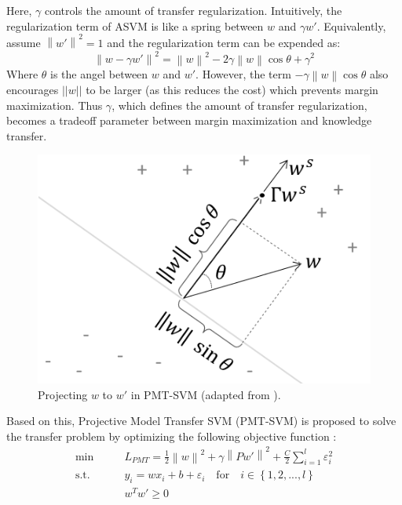 Here, $\gamma$ controls the amount of transfer regularization. Intuitively, the regularization term of ASVM is like a spring between $w$ and $\gamma w'$. Equivalently, assume ${\left\| {w'} \right\|^2}=1$ and the regularization term can be expended as:
\begin{equation*}
{\left\| {w - \gamma w'} \right\|^2} = {\left\| w \right\|^2} - 2\gamma \left\| w \right\|\cos \theta  + {\gamma ^2}
\end{equation*}
Where $\theta$ is the angel between $w$ and $w'$. However, the term $-\gamma \left\| w \right\|\cos \theta$ also encourages $||w||$
to be larger (as this reduces the cost) which prevents margin maximization. Thus $\gamma$, which defines the amount of transfer regularization, becomes a tradeoff parameter between margin maximization and knowledge transfer.
\begin{figure}
\centering
\includegraphics[scale=.6]{transfer/fig/pmt-svm.png}
\caption{Projecting $w$ to $w'$ in PMT-SVM (adapted from \cite{aytar2011tabula}).}\label{fig:gama:pmt}
\end{figure}

Based on this, Projective Model Transfer SVM (PMT-SVM) is proposed to solve the transfer problem by optimizing the following objective function \cite{aytar2011tabula}:
\begin{equation}\label{eq:gama:pmt}
\begin{aligned}
\min \qquad& {L_{PMT}} = \frac{1}{2}{\left\| w \right\|^2} + \gamma {\left\| {Pw'} \right\|^2} + \frac{C}{2}\sum\limits_{i = 1}^l {\varepsilon _i^2} \\
\text{s.t.}\qquad&{y_i} = w{x_i} + b + {\varepsilon _i} \quad   \text{for} \quad i \in \left\{ {1,2,...,l} \right\}\\
& w^Tw' \ge 0
\end{aligned}
\end{equation}

